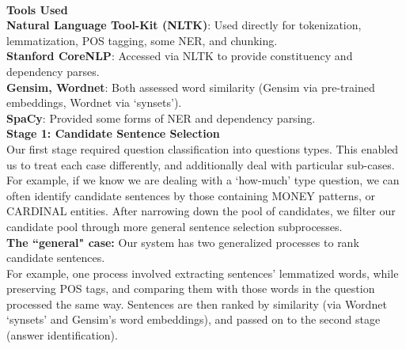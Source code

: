 \documentclass[a1,landscape]{a0poster}
\begin{document}
\begin{multicols}{3}
\color{DarkSlateGray} %

\textbf{\LARGE \\Tools Used}\\
\textbf{Natural Language Tool-Kit (NLTK)}: Used directly for tokenization, lemmatization, POS tagging, some NER, and chunking.\\
\textbf{Stanford CoreNLP}: Accessed via NLTK to provide constituency and dependency parses. \\
\textbf{Gensim, Wordnet}: Both assessed word similarity (Gensim via pre-trained embeddings, Wordnet via `synsets'). \\
\textbf{SpaCy}: Provided some forms of NER and dependency parsing.\\
\textbf{\LARGE Stage 1: Candidate Sentence Selection}\\
Our first stage required question classification into questions types. This enabled us to treat each case differently, and additionally deal with particular sub-cases. \\
For example, if we know we are dealing with a `how-much' type question, we can often identify candidate sentences by those containing MONEY patterns, or CARDINAL entities. After narrowing down the pool of candidates, we filter our candidate pool through more general sentence selection subprocesses. \\
\textbf{The ``general" case:} Our system has two generalized processes to rank candidate sentences.\\ For example, one process involved extracting sentences' lemmatized words, while preserving POS tags, and comparing them with those words in the question processed the same way. Sentences are then ranked by similarity (via Wordnet `synsets' and Gensim's word embeddings), and passed on to the second stage (answer identification).


\end{multicols}
\end{document}
